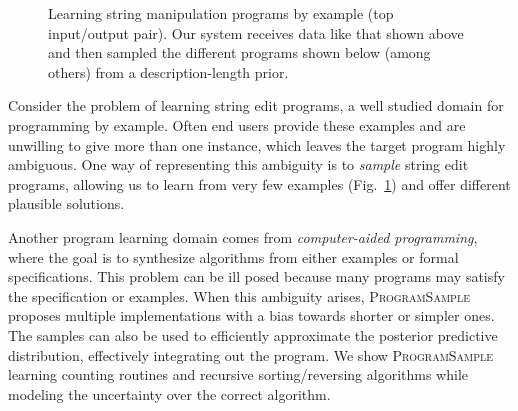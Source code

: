 \documentclass{article}
\newcommand{\theSystem}{\textsc{ProgramSample}}
\begin{document}
\begin{figure}
  \centering\vspace{-0.5cm}
  \caption{Learning string manipulation programs by example (top input/output pair). Our system receives data like that shown above and then sampled the different programs shown below (among others) from a description-length prior.}
  \label{ambiguous}
\end{figure}


Consider the problem of learning string edit programs, a well studied domain for programming by example.
Often end users provide these examples and are unwilling to give more than one instance,
which leaves the target program highly ambiguous.
One way of representing this ambiguity is to \emph{sample} string edit programs,
allowing us to learn from very few examples (Fig.~\ref{ambiguous})
and offer different plausible solutions.


  


Another program learning domain comes from \emph{computer-aided programming}, where the goal is to synthesize algorithms from
either examples or formal specifications.
This problem can be ill posed because many programs may satisfy the specification or examples.
When this ambiguity arises,
\theSystem{} proposes multiple implementations with a bias towards shorter or simpler ones.
The samples can also be used to efficiently approximate the posterior predictive distribution, effectively integrating out the program.
We show \theSystem{} learning counting routines and recursive sorting/reversing algorithms
while modeling the uncertainty over the correct algorithm.
\end{document}
